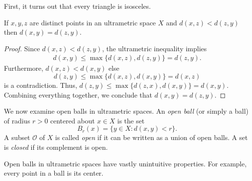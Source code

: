 First, it turns out that every triangle is isosceles.
\begin{lemma}
\label{lem:1}
If \( x, y, z \) are distinct points in an ultrametric space \( X \) and \( d(x,z) < d(z,y) \) then \( d(x, y) = d(z,y) \).
\end{lemma}
\begin{proof}
Since \( d(x,z) < d(z,y) \), the ultrametric inequality implies
\begin{align*}
	d(x,y) \leq \max \{ d(x,z), d(z,y) \} = d(z,y).
\end{align*}
Furthermore, \( d(x,z) < d(x,y) \) else \[ d(z,y) \leq \max \{ d(x,z), d(x,y) \} = d(x,z) \] is a contradiction. Thus, \( d(z , y) \leq \max \{ d(z,x), d(x,y) \} = d(x,y) \). Combining everything together, we conclude that \( d(x,y) = d(z,y) \).
\end{proof}

We now examine open balls in ultrametric spaces. An \emph{open ball} (or simply a ball) of radius \( r > 0 \) centered about \( x \in  X \) is the set \[ B_{r }(x) = \{ y \in X : d(x,y) < r \}.  \] A subset \( \mathcal{O}  \) of \( X \) is called \emph{open} if it can be written as a union of open balls. A set is \emph{closed} if its complement is open.

Open balls in ultrametric spaces have vastly unintuitive properties. For example, every point in a ball is its center.

